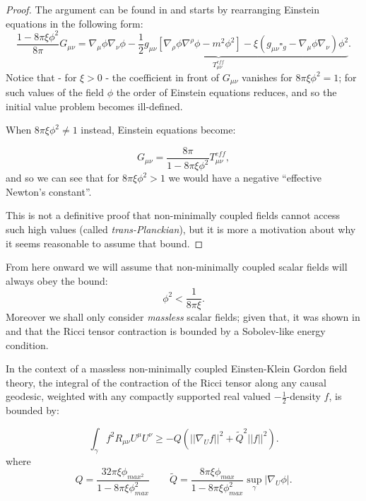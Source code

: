 \begin{proof}
    The argument can be found in \cite*{kontou2020energy} and starts by rearranging Einstein equations in the following form:
    \[
      \frac{1 - 8\pi\xi\phi^2}{8\pi}G_{\mu\nu} =  \underbrace{\nabla_{\mu}\phi\nabla_{\nu}\phi - \frac{1}{2}g_{\mu\nu}\left[\nabla_{\rho}\phi\nabla^{\rho}\phi - m^2\phi^2\right] - \xi\left(g_{\mu\nu}\square_g - \nabla_{\mu}\phi\nabla_{\nu}\right)\phi^2}_{T^{eff}_{\mu\nu}}.
    \]
    Notice that - for \(\xi > 0\) - the coefficient in front of \(G_{\mu\nu}\) vanishes for \(8\pi\xi\phi^2 = 1\); for such values of the field \(\phi\) the order of Einstein equations reduces, and so the initial value problem becomes ill-defined.

    When \(8\pi\xi\phi^2 \neq 1\) instead, Einstein equations become:

    \[
        G_{\mu\nu} = \frac{8\pi}{1 - 8\pi\xi\phi^2}T^{eff}_{\mu\nu},
    \]
    and so we can see that for \(8\pi\xi\phi^2 > 1\) we would have a negative ``effective Newton's constant''. 

    This is not a definitive proof that non-minimally coupled fields cannot access such high values (called \emph{trans-Planckian}), but it is more a motivation about why it seems reasonable to assume that bound. 
\end{proof}

From here onward we will assume that non-minimally coupled scalar fields will always obey the bound:
\[
\phi^2 < \frac{1}{8\pi\xi}.    
\]
Moreover we shall only consider \emph{massless} scalar fields; given that, it was shown in \cite{fewster2011singularity} and \cite{brown2018singularity} that the Ricci tensor contraction is bounded by a Sobolev-like energy condition.

\begin{prop}
    In the context of a massless non-minimally coupled Einsten-Klein Gordon field theory, the integral of the contraction of the Ricci tensor along any causal geodesic, weighted with any compactly supported real valued \(-\frac{1}{2}\)-density \(f\), is bounded by:

    \begin{equation}
        \int_{\gamma}f^2 R_{\mu\nu}U^{\mu}U^{\nu} \ge -Q\left(\vert\vert\nabla_U f \vert\vert^2 + \tilde{Q}^2 \vert\vert f\vert\vert^2\right).
    \end{equation}
    where 
    \[
    Q = \frac{32\pi\xi\phi_{max^2}}{1 - 8\pi\xi\phi_{max}
    ^2}
    \quad\quad
    \tilde{Q} = \frac{8\pi\xi\phi_{max}}{1 - 8\pi\xi\phi_{max}
    ^2}\sup_{\gamma}\vert \nabla_U\phi\vert.
    \]
\end{prop}

